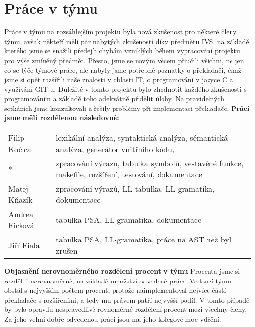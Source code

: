 \documentclass[11pt, titlepage, a4paper]{article}
\begin{document}
		\section{Práce v týmu}
		\indent \indent Práce v týmu na rozsáhlejším projektu byla nová zkušenost pro některé členy týmu, avšak někteří měli pár nabytých zkušeností díky
		předmětu IVS, na základě kterého jsme se snažili předejít chybám vzniklých během vypracování projektu pro výše zmíněný předmět.
		Přesto, jsme se novým věcem přiučili všichni, ne jen co se týče týmové práce, ale nabyly jsme potřebné poznatky o překladači, čímž jsme si opět
		rozšířili naše znalosti v oblasti IT, o  programování v jazyce C a využívání GIT-u. Důležité v tomto projektu bylo zhodnotit každého zkušenosti s
		programováním a základě toho adekvátně přidělit úlohy. Na pravidelných setkáních jsme konzultovali a řešily problémy při implementaci překladače.
		\newline
		\newline
		\textbf{Práci jsme měli rozdělenou následovně:}
		\newline\newline
		\begin{tabular}{ll}
		 Filip Kočica & lexikální analýza, syntaktická analýza, sémantická analýza, generátor vnitřního kódu,  \\
		 * &  zpracování výrazů, tabulka symbolů, vestavěné funkce, makefile, rozšíření, testování, dokumentace \\

		 Matej Kňazík & zpracování výrazů, LL-tabulka, LL-gramatika, dokumentace\\

		 Andrea Ficková & tabulka PSA, LL-gramatika, dokumentace \\

		 Jiří Fiala & tabulka PSA, LL-gramatika, práce na AST než byl zrušen \\
		 \end{tabular}
		 \newline
		 \newline
		 \newline
		 \textbf{Objasnění nerovnoměrného rozdělení procent v týmu} \newline\newline
		 \indent  Procenta jsme si rozdělili nerovnoměrně, na základě množství odvedené práce. Vedoucí týmu obstál s nejvyšším počtem procent, protože
		naimplementoval nejvíce částí překladače s rozšířeními, a tedy mu právem patří nejvyšší podíl. V tomto případě by bylo opravdu nespravedlivé
		rovnoměrné rozdělení procent mezi všechny členy. Za jeho velmi dobře odvedenou práci jsou mu jeho kolegové moc vděční.
\end{document}

